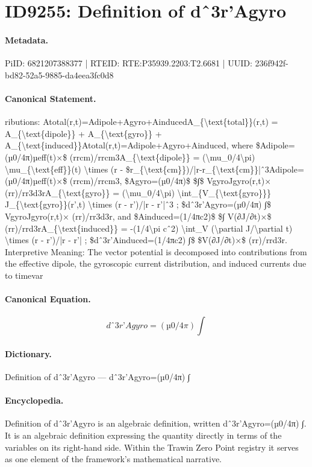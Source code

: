 \section*{ID9255: Definition of dˆ3r’Agyro}
\paragraph{Metadata.}
PiID: 6821207388377 | RTEID: RTE:P35939.2203:T2.6681 | UUID: 236f942f-bd82-52a5-9885-da4eea3fc0d8

\paragraph{Canonical Statement.}
ributions: Atotal(r,t)=Adipole+Agyro+AinducedA\_\{\textbackslash{}text\{total\}\}(r,t) = A\_\{\textbackslash{}text\{dipole\}\} + A\_\{\textbackslash{}text\{gyro\}\} + A\_\{\textbackslash{}text\{induced\}\}Atotal(r,t)=Adipole+Agyro+Ainduced, where \$Adipole=(µ0/4π)µeff(t)×\$ (rrcm)/rrcm3A\_\{\textbackslash{}text\{dipole\}\} = (\textbackslash{}mu\_0/4\textbackslash{}pi) \textbackslash{}mu\_\{\textbackslash{}text\{eff\}\}(t) \textbackslash{}times (r - \$r\_\{\textbackslash{}text\{cm\}\})/|r-r\_\{\textbackslash{}text\{cm\}\}|ˆ3Adipole=(µ0/4π)µeff(t)×\$ (rrcm)/rrcm3, \$Agyro=(µ0/4π)\$ \$∫\$ VgyroJgyro(r,t)× (rr)/rr3d3rA\_\{\textbackslash{}text\{gyro\}\} = (\textbackslash{}mu\_0/4\textbackslash{}pi) \textbackslash{}int\_\{V\_\{\textbackslash{}text\{gyro\}\}\} J\_\{\textbackslash{}text\{gyro\}\}(r’,t) \textbackslash{}times (r - r’)/|r - r’|ˆ3 ; \$dˆ3r’Agyro=(µ0/4π) ∫\$ VgyroJgyro(r,t)× (rr)/rr3d3r, and \$Ainduced=(1/4πc2)\$ \$∫ V(∂J/∂t)×\$ (rr)/rrd3rA\_\{\textbackslash{}text\{induced\}\} = -(1/4\textbackslash{}pi cˆ2) \textbackslash{}int\_V (\textbackslash{}partial J/\textbackslash{}partial t) \textbackslash{}times (r - r’)/|r - r’| ; \$dˆ3r’Ainduced=(1/4πc2) ∫\$ \$V(∂J/∂t)×\$ (rr)/rrd3r. Interpretive Meaning: The vector potential is decomposed into contributions from the effective dipole, the gyroscopic current distribution, and induced currents due to timevar

\paragraph{Canonical Equation.}
\[
dˆ3r’Agyro=(µ0/4π) ∫
\]

\paragraph{Dictionary.}
Definition of dˆ3r’Agyro — dˆ3r’Agyro=(µ0/4π) ∫

\paragraph{Encyclopedia.}
Definition of dˆ3r’Agyro is an algebraic definition, written dˆ3r’Agyro=(µ0/4π) ∫. It is an algebraic definition expressing the quantity directly in terms of the variables on its right-hand side. Within the Trawin Zero Point registry it serves as one element of the framework's mathematical narrative.
